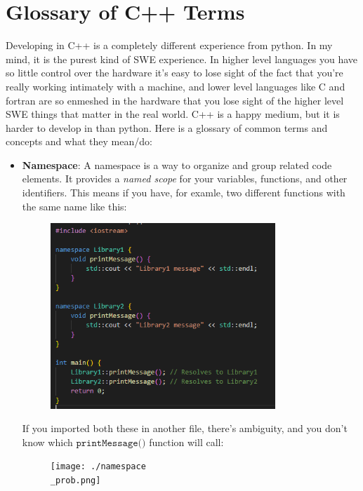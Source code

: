 \documentclass[12pt]{article}
\begin{document}
\section{Glossary of C++ Terms}
Developing in C++ is a completely different experience from python. In my mind, it is the purest kind of SWE experience. In higher level languages you have so little control over the hardware it's easy to lose sight of the fact that you're really working intimately with a machine, and lower level languages like C and fortran are so enmeshed in the hardware that you lose sight of the higher level SWE things that matter in the real world. C++ is a happy medium, but it is harder to develop in than python. Here is a glossary of common terms and concepts and what they mean/do:\\
\begin{itemize}
\item \textbf{Namespace}: A namespace is a way to organize and group related code elements. It provides a \emph{named scope} for your variables, functions, and other identifiers. This means if you have, for examle, two different functions with the same name like this:
\begin{figure}[H]
    \centering
    \includegraphics[width=0.8\textwidth]{./namespace.png} %
\end{figure}
If you imported both these in another file, there's ambiguity, and you don't know which \(\texttt{printMessage()}\) function will call:
\begin{figure}[H]
    \centering
    \texttt{[image: ./namespace\\\_prob.png]} %
\end{figure}

\end{itemize}
\end{document}

